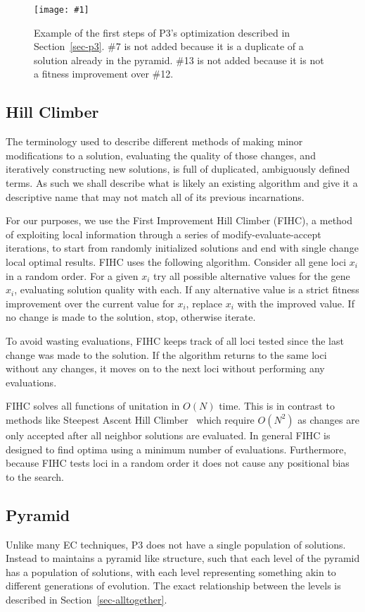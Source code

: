 \documentclass{sig-alternate}
\newcommand{\includegraphicsfit}[1]
{\texttt{[image: \#1]}}
\begin{document}
\begin{figure}
  \centering
  \includegraphicsfit{P3_big_fail}
  \caption{Example of the first steps of P3's optimization described in Section~\ref{sec-p3}.
  \#7 is not added because it is a duplicate of a solution already in the pyramid.  \#13 is
  not added because it is not a fitness improvement over \#12.}
  \label{fig-p3}
\end{figure}

\subsection{Hill Climber}
\label{sec-hillclimber}
The terminology used to describe different methods of making minor modifications
to a solution, evaluating the quality of those changes, and iteratively constructing
new solutions, is full of duplicated, ambiguously defined terms.  As such we shall
describe what is likely an existing algorithm and give it a descriptive name that
may not match all of its previous incarnations.

For our purposes, we use the First Improvement Hill Climber (FIHC), a method of exploiting
local information through a series of modify-evaluate-accept iterations, to start
from randomly initialized solutions and end with single change local optimal results.
FIHC uses the following algorithm.  Consider all gene loci $x_i$ in a random order.
For a given $x_i$ try all possible alternative values for the gene $x_i$, evaluating
solution quality with each.  If any alternative value is a strict fitness improvement
over the current value for $x_i$, replace $x_i$ with the improved value.  If no
change is made to the solution, stop, otherwise iterate.

To avoid wasting evaluations, FIHC keeps track of all loci tested since the last
change was made to the solution.  If the algorithm returns to the same loci without
any changes, it moves on to the next loci without performing any evaluations.

FIHC solves all functions of unitation in $O(N)$ time.  This is in contrast to
methods like Steepest Ascent Hill Climber~\cite{bosman:2011:lsbbo, goldman:2012:ltga}
which require $O(N^2)$ as changes are only accepted after all neighbor solutions
are evaluated.  In general FIHC is designed to find optima using a minimum number
of evaluations.  Furthermore, because FIHC tests loci in a random order it does
not cause any positional bias to the search.


\subsection{Pyramid}
\label{sec-pyramid}
Unlike many EC techniques, P3 does not have a single population of solutions.
Instead to maintains a pyramid like structure, such that each level of the pyramid
has a population of solutions, with each level representing something akin to different
generations of evolution.  The exact relationship between the levels is described
in Section~\ref{sec-alltogether}.
\end{document}
